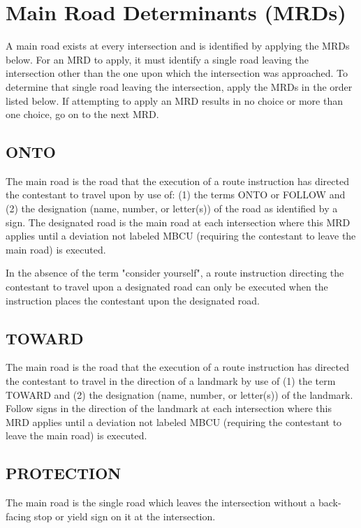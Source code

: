 \section{Main Road Determinants (MRDs)}
\label{sec:mrd} A main road exists at every intersection and is identified by applying the MRDs below.  For an MRD to apply, it must identify a single road leaving the intersection other than the one upon which the intersection was approached.  To determine that single road leaving the intersection, apply the MRDs in the order listed below.  If attempting to apply an MRD results in no choice or more than one choice, go on to the next MRD.

\subsection{ONTO}
\label{sec:follow} The main road is the road that the execution of a route instruction has directed the contestant to travel upon by use of: (1) the terms ONTO or FOLLOW and (2) the designation (name, number, or letter(s)) of the road as identified by a sign.  The designated road is the main road at each intersection where this MRD applies until a deviation not labeled MBCU (requiring the contestant to leave the main road) is executed.

In the absence of the term "consider yourself", a route instruction directing the contestant to travel upon a designated road can only be executed when the instruction places the contestant upon the designated road.

\subsection{TOWARD}
The main road is the road that the execution of a route instruction has directed the contestant to travel in the direction of a landmark by use of (1) the term TOWARD and (2) the designation (name, number, or letter(s)) of the landmark.  Follow signs in the direction of the landmark at each intersection where this MRD applies until a deviation not labeled MBCU (requiring the contestant to leave the main road) is executed.

\subsection{PROTECTION}
The main road is the single road which leaves the intersection without a back-facing stop or yield sign on it at the intersection.


